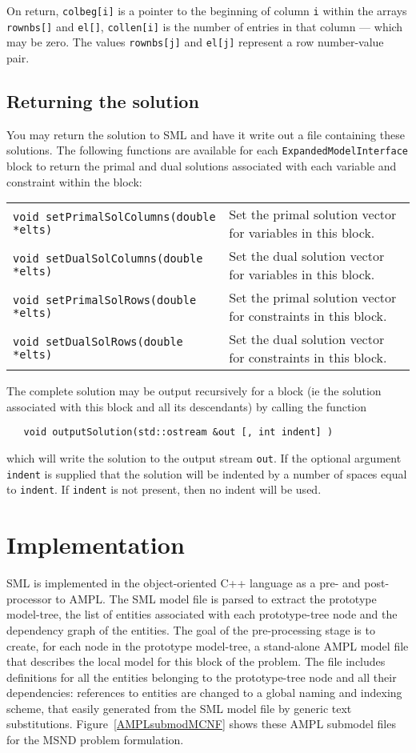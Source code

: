 \documentclass[10pt,a4paper]{book}
\begin{document}
On return, {\tt colbeg[i]} is a pointer to the beginning of column {\tt i}
within the arrays {\tt rownbs[]} and {\tt el[]}, {\tt collen[i]} is the number
of entries in that column --- which may be zero. The values {\tt rownbs[j]} and
{\tt el[j]} represent a row number-value pair.

\subsection{Returning the solution}
You may return the solution to SML and have it write out a file containing
these solutions. The following functions are available for each
{\tt ExpandedModelInterface} block to return the primal and dual solutions
associated with each variable and constraint within the block: \\
\begin{tabular}{ll}
{\tt void setPrimalSolColumns(double *elts)} & 
   Set the primal solution vector for variables in this block. \\
{\tt void setDualSolColumns(double *elts)} & 
   Set the dual solution vector for variables in this block. \\
{\tt void setPrimalSolRows(double *elts)} & 
   Set the primal solution vector for constraints in this block. \\
{\tt void setDualSolRows(double *elts)} & 
   Set the dual solution vector for constraints in this block.
\end{tabular}

The complete solution may be output recursively for a block (ie the solution
associated with this block and all its descendants) by calling the function
\begin{verbatim}
   void outputSolution(std::ostream &out [, int indent] )
\end{verbatim}
which will write the solution to the output stream {\tt out}. If the optional
argument {\tt indent} is supplied that the solution will be indented by a
number of spaces equal to {\tt indent}. If {\tt indent} is not present, then
no indent will be used.

\section{Implementation} \label{implementation}

SML is implemented in the object-oriented C++ language as a
pre- and post-processor to AMPL.  
The SML model file
is parsed to extract the prototype model-tree, the list of entities
associated with each prototype-tree node and the dependency graph of
the entities. 
The goal of the pre-processing stage is to create, for each node in the
prototype model-tree, a stand-alone AMPL model file that describes the
local model for this block of the problem. 
The file includes definitions for all the
entities belonging to the prototype-tree node and all their
dependencies: references to entities are changed to a
global naming and indexing scheme, that easily generated from the
SML model file by generic text substitutions.  
Figure~\ref{AMPLsubmodMCNF} shows these AMPL submodel files for the MSND problem formulation. 
\end{document}
